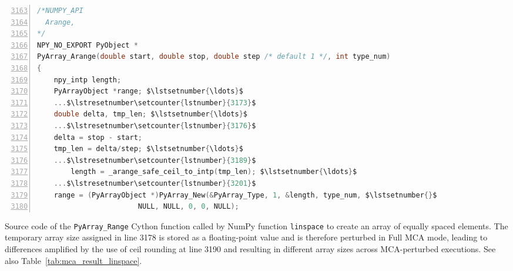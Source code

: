 \documentclass[11pt]{article}
\begin{document}
    

\begin{listing}
    \begin{lstlisting}[language=C,style=customC,numbers=left, firstnumber=3163, mathescape=true]
/*NUMPY_API
  Arange,
*/
NPY_NO_EXPORT PyObject *
PyArray_Arange(double start, double stop, double step /* default 1 */, int type_num) 
{
    npy_intp length; 
    PyArrayObject *range; $\lstsetnumber{\ldots}$
    ...$\lstresetnumber\setcounter{lstnumber}{3173}$
    double delta, tmp_len; $\lstsetnumber{\ldots}$
    ...$\lstresetnumber\setcounter{lstnumber}{3176}$
    delta = stop - start; 
    tmp_len = delta/step; $\lstsetnumber{\ldots}$
    ...$\lstresetnumber\setcounter{lstnumber}{3189}$
        length = _arange_safe_ceil_to_intp(tmp_len); $\lstsetnumber{\ldots}$
    ...$\lstresetnumber\setcounter{lstnumber}{3201}$
    range = (PyArrayObject *)PyArray_New(&PyArray_Type, 1, &length, type_num, $\lstsetnumber{}$
                        NULL, NULL, 0, 0, NULL);
    \end{lstlisting}
\caption{Source code of the \texttt{PyArray\_Range} Cython function called by NumPy function \texttt{linspace} to create an array of equally spaced elements. The temporary array size assigned in line 3178 is stored as a floating-point value and is therefore perturbed in Full MCA mode, leading to differences amplified by the use of ceil rounding at line 3190 and resulting in different array sizes across MCA-perturbed executions. See also Table~\ref{tab:mca_result_linspace}.}
    \label{fig:pyarray_range_code}

\end{listing}
\end{document}
